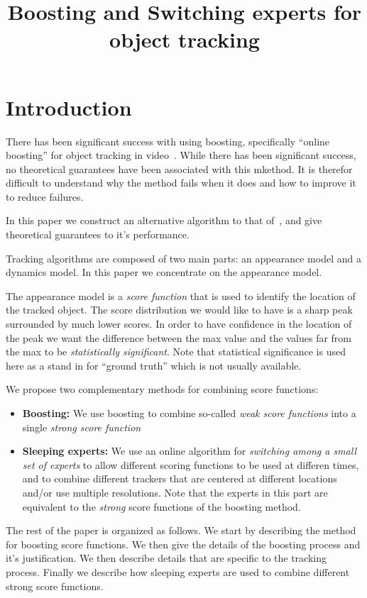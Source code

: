 \documentclass[11pt]{article}
\title{Boosting and Switching experts for object tracking}
\begin{document}
\maketitle

\newcommand{\bx}{{\bf x}}
\newcommand{\by}{{\bf y}}

\section{Introduction}
There has been significant success with using boosting, specifically
``online boosting'' for object tracking in video~\cite{}. While there
has been significant success, no theoretical guarantees have been
associated with this mkethod. It is therefor difficult to understand
why the method fails when it does and how to improve it to reduce
failures.

In this paper we construct an alternative algorithm to that
of~\cite{}, and give theoretical guarantees to it's performance.

Tracking algorithms are composed of two main parts: an appearance
model and a dynamics model. In this paper we concentrate on the
appearance model.

The appearance model is a {\em score function} that is used to
identify the location of the tracked object. The score distribution we
would like to have is a sharp peak surrounded by much lower
scores. In order to have confidence in the location of the peak we
want the difference between the max value and the values far from the
max to be {\em statistically significant}. Note that statistical
significance is used here as a stand in for ``ground truth'' which is
not usually available.

We propose two complementary methods for combining score functions:
\begin{itemize}
\item {\bf Boosting:} We use boosting to combine so-called {\em weak
  score functions} into a single {\em strong score function}
\item{\bf Sleeping experts:} We use an online algorithm for {\em
  switching among a small set of experts} to allow different scoring
  functions to be used at differen times, and to combine different
  trackers that are centered at different locations and/or use
  multiple resolutions. Note that the experts in this part are
  equivalent to the {\em strong} score functions of the boosting method.
\end{itemize}

The rest of the paper is organized as follows. We start by describing
the method for boosting score functions. We then give the details of
the boosting process and it's justification. We then describe details
that are specific to the tracking process. Finally we describe how
sleeping experts are used to combine different strong score functions.
\end{document}

